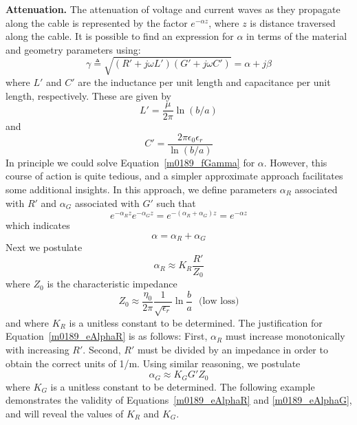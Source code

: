 {\bf Attenuation.}
The attenuation of voltage and current waves as they propagate along the cable is represented by the factor $e^{-\alpha z}$, where $z$ is distance traversed along the cable. 
It is possible to find an expression for $\alpha$ in terms of the material and geometry parameters using:
%
\begin{equation}
\gamma \triangleq \sqrt{ \left( R' + j\omega L' \right) \left( G' + j\omega C' \right)} = \alpha + j\beta 
\label{m0189_fGamma}
\end{equation}
%
where $L'$ and $C'$ are the inductance per unit length and capacitance per unit length, respectively.
These are given by
%
\begin{equation}
L' = \frac{\mu}{2\pi}\ln{\left(b/a\right)}
\end{equation}
%
and
%
\begin{equation}
C' = \frac{2\pi\epsilon_0\epsilon_r}{\ln{\left(b/a\right)}}
\end{equation}
%
In principle we could solve Equation~\ref{m0189_fGamma} for $\alpha$.  
However, this course of action is quite tedious, and a simpler approximate approach facilitates some additional insights. 
In this approach, we define parameters $\alpha_R$ associated with $R'$ and $\alpha_G$ associated with $G'$ such that
%
\begin{equation}
e^{-\alpha_R z} e^{-\alpha_G z} = e^{-\left(\alpha_R+\alpha_G\right) z} = e^{-\alpha z} 
\end{equation}
%
which indicates 
%
\begin{equation}
\alpha = \alpha_R + \alpha_G
\end{equation}
%
Next we postulate 
%
\begin{equation}
\alpha_R \approx K_R \frac{R'}{Z_0} 
\label{m0189_eAlphaR}
\end{equation}
%
where $Z_0$ is the characteristic impedance 
%
\begin{equation}
Z_0 \approx \frac{\eta_0}{2\pi}\frac{1}{\sqrt{\epsilon_r}}\ln{\frac{b}{a}}~~~\mbox{(low loss)}
\label{m0189_eZ0cc}
\end{equation}
%
and where $K_R$ is a unitless constant to be determined.
The justification for Equation~\ref{m0189_eAlphaR} is as follows: 
First, $\alpha_R$ must increase monotonically with increasing $R'$.
Second, $R'$ must be divided by an impedance in order to obtain the correct units of 1/m.
Using similar reasoning, we postulate
%
\begin{equation}
\alpha_G \approx K_G G' Z_0
\label{m0189_eAlphaG}
\end{equation}
%
where $K_G$ is a unitless constant to be determined.
The following example demonstrates the validity of Equations~\ref{m0189_eAlphaR} and \ref{m0189_eAlphaG}, and will reveal the values of $K_R$ and $K_G$.

